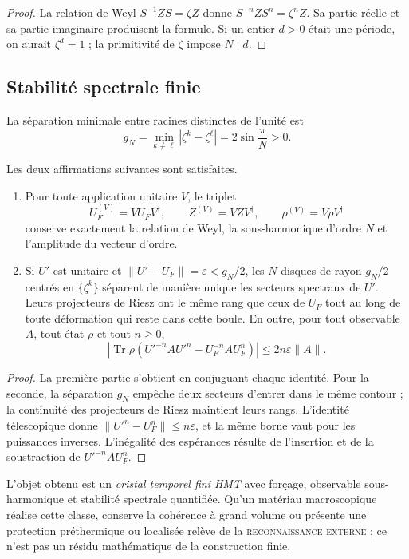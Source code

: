\begin{proof}
La relation de Weyl \(S^{-1} Z S=\zeta Z\) donne
\(S^{-n} Z S^n=\zeta^n Z\). Sa partie réelle et sa partie imaginaire produisent la
formule. Si un entier \(d>0\) était une période, on aurait
\(\zeta^d=1\) ; la primitivité de \(\zeta\) impose \(N\mid d\).
\end{proof}

\subsection{Stabilité spectrale finie}

La séparation minimale entre racines distinctes de l’unité est
\[
 g_N=\min_{k\ne\ell}|\zeta^k-\zeta^\ell|
 =2\sin\frac{\pi}{N}>0.
\]

\begin{theorem}
\label{v:thm:hmtf2-estabilidad-cristal}
Les deux affirmations suivantes sont satisfaites.

\begin{enumerate}
 \item Pour toute application unitaire \(V\), le triplet
 \[
  U_F^{(V)}=V U_F V^\dagger,\qquad
  Z^{(V)}=V Z V^\dagger,\qquad
  \rho^{(V)}=V\rho V^\dagger
 \]
 conserve exactement la relation de Weyl, la sous-harmonique d’ordre \(N\) et
 l’amplitude du vecteur d’ordre.
 \item Si \(U'\) est unitaire et
 \(\|U'-U_F\|=\varepsilon<g_N/2\), les \(N\) disques de rayon
 \(g_N/2\) centrés en \(\{\zeta^k\}\) séparent de manière unique les secteurs
 spectraux de \(U'\). Leurs projecteurs de Riesz ont le même rang que
 ceux de \(U_F\) tout au long de toute déformation qui reste dans cette boule.
 En outre, pour tout observable \(A\), tout état \(\rho\) et tout \(n\geq0\),
 \[
 \left|
 \operatorname{Tr}\rho\left(U'^{-n}AU'^n-U_F^{-n}AU_F^n\right)
 \right|
 \leq 2n\varepsilon\|A\|.
 \]
\end{enumerate}
\end{theorem}

\begin{proof}
La première partie s’obtient en conjuguant chaque identité. Pour la seconde, la
séparation \(g_N\) empêche deux secteurs d’entrer dans le même contour ; la
continuité des projecteurs de Riesz maintient leurs rangs. L’identité
télescopique donne
\(\|U'^n-U_F^n\|\leq n\varepsilon\), et la même borne vaut pour les
puissances inverses. L’inégalité des espérances résulte de l’insertion et de la
soustraction de \(U'^{-n}AU_F^n\).
\end{proof}

L’objet obtenu est un \emph{cristal temporel fini HMT} avec forçage,
observable sous-harmonique et stabilité spectrale quantifiée. Qu’un matériau
macroscopique réalise cette classe, conserve la cohérence à grand volume ou
présente une protection préthermique ou localisée relève de la
\textsc{reconnaissance externe} ; ce n’est pas un résidu mathématique de la
construction finie.


